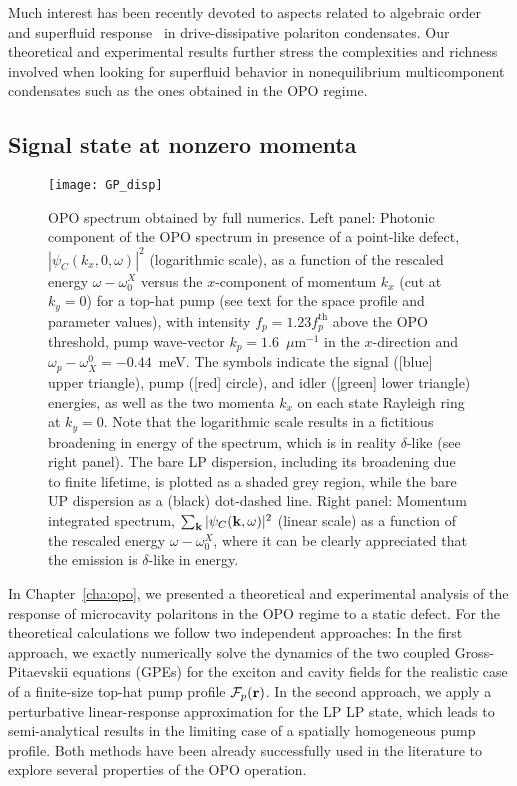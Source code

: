 Much interest has been recently devoted to aspects related to
algebraic order~\cite{Altman_2015,PhysRevX.5.041028} and superfluid
response~\cite{Keeling_2011_prl} in drive-dissipative polariton
condensates. Our theoretical and experimental results further stress
the complexities and richness involved when looking for superfluid
behavior in nonequilibrium multicomponent condensates such as the ones
obtained in the OPO regime.


\begin{subappendices}
\section{Signal state at nonzero momenta}
\label{app:SM}
%
\begin{figure}[tb]\centering
\texttt{[image: GP\_disp]}
\caption{OPO spectrum obtained by full numerics. Left
  panel: Photonic component of the OPO spectrum in presence of a
  point-like defect, $|\psi_C(k_x,0,\omega)|^2$ (logarithmic scale),
  as a function of the rescaled energy $\omega - \omega_0^X$ versus
  the $x$-component of momentum $k_x$ (cut at $k_y=0$) for a top-hat
  pump (see text for the space profile and parameter values), with
  intensity $f_p=1.23 f_p^{\text{th}}$ above the OPO threshold, pump
  wave-vector $k_p=1.6$~$\mu$m$^{-1}$ in the $x$-direction and
  $\omega_p-\omega_X^0=-0.44$~meV. The symbols indicate the signal
  ([blue] upper triangle), pump ([red] circle), and idler ([green]
  lower triangle) energies, as well as the two momenta $k_x$ on each
  state Rayleigh ring at $k_y=0$. Note that the logarithmic scale
  results in a fictitious broadening in energy of the spectrum, which
  is in reality $\delta$-like (see right panel). The bare LP
  dispersion, including its broadening due to finite lifetime, is
  plotted as a shaded grey region, while the bare UP dispersion as a
  (black) dot-dashed line. Right panel: Momentum integrated spectrum,
  $\sum_{\mathbf{k}} |\psi_C(\mathbf{k},\omega)|^2$ (linear scale) as a
  function of the rescaled energy $\omega - \omega_0^X$, where it can
  be clearly appreciated that the emission is $\delta$-like in
  energy.}
\label{fig:spectGP}
\end{figure}
%
In Chapter~\ref{cha:opo}, we presented a theoretical and experimental
analysis of the response of microcavity polaritons in the OPO regime
to a static defect.
%
For the theoretical calculations we follow two independent approaches:
In the first approach, we exactly numerically solve the dynamics of
the two coupled Gross-Pitaevskii equations (GPEs) for the exciton and
cavity fields for the realistic case of a finite-size top-hat pump
profile $\mathcal{F}_p(\mathbf{r})$. In the second approach, we apply a
perturbative linear-response approximation for the LP
LP state, which leads to semi-analytical results in the limiting case
of a spatially homogeneous pump profile. Both methods have been
already successfully used in the literature to explore several
properties of the OPO operation.


\end{subappendices}
